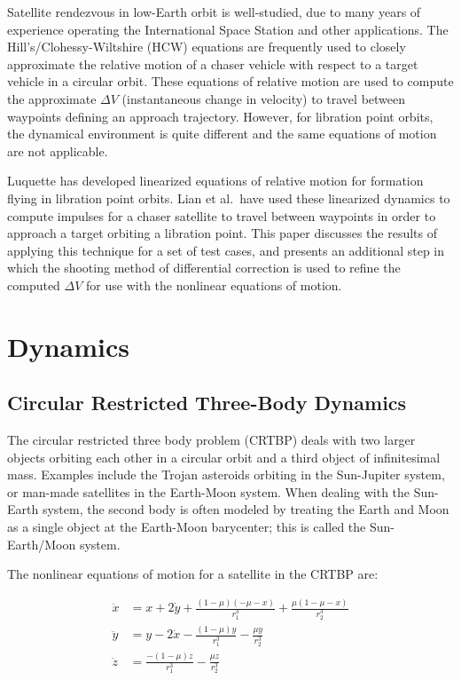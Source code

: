 \documentclass[letterpaper, preprint, paper,11pt]{AAS}	%
\begin{document}
Satellite rendezvous in low-Earth orbit is well-studied, due to many years of experience operating the International Space Station and other applications.  The Hill's/Clohessy-Wiltshire (HCW) equations are frequently used to closely approximate the relative motion of a chaser vehicle with respect to a target vehicle in a circular orbit.\cite{clohessy1960}  These equations of relative motion are used to compute the approximate \(\Delta V\) (instantaneous change in velocity) to travel between waypoints defining an approach trajectory.  However, for libration point orbits, the dynamical environment is quite different and the same equations of motion are not applicable.  %

Luquette has developed linearized equations of relative motion for formation flying in libration point orbits.\cite{luquette2004}   Lian et al.~have used these linearized dynamics to compute impulses for a chaser satellite to travel between waypoints in order to approach a target orbiting a libration point.\cite{lian2011}  This paper discusses the results of applying this technique for a set of test cases, and presents an additional step in which the shooting method of differential correction is used to refine the computed \(\Delta V\) for use with the nonlinear equations of motion.  %

\section{Dynamics}

\subsection{Circular Restricted Three-Body Dynamics}
The circular restricted three body problem (CRTBP) deals with two larger objects orbiting each other in a circular orbit and a third object of infinitesimal mass.  Examples include the Trojan asteroids orbiting in the Sun-Jupiter system, or man-made satellites in the Earth-Moon system.  When dealing with the Sun-Earth system, the second body is often modeled by treating the Earth and Moon as a single object at the Earth-Moon barycenter; this is called the Sun-Earth/Moon system.

The nonlinear equations of motion for a satellite in the CRTBP are:

\begin{equation} \label{eq:CRTBP}
	\begin{aligned}
		\ddot{x} &= x + 2\dot{y} + \frac{(1 - \mu)(-\mu - x)}{r_1^3} + \frac{\mu(1 - \mu - x)}{r_2^3} \\
		\ddot{y} &= y - 2\dot{x} - \frac{(1 - \mu)y}{r_1^3} - \frac{\mu y}{r_2^3} \\
		\ddot{z} &= \frac{-(1 - \mu)z}{r_1^3} - \frac{\mu z}{r_2^3}
	\end{aligned}
\end{equation}
\end{document}
